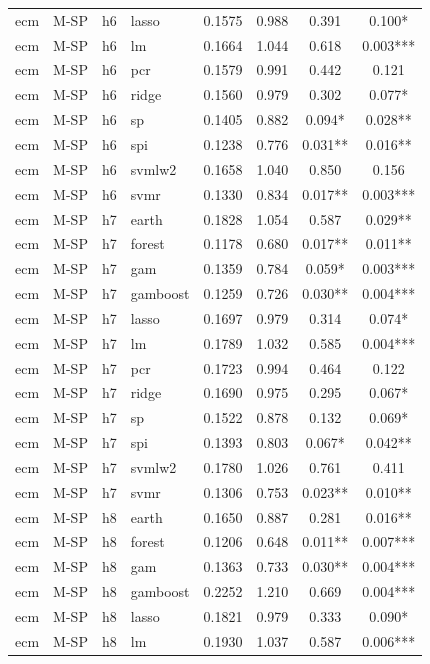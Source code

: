 \begin{ThreePartTable}
\begin{longtable}[t]{llclcccc}
ecm & M-SP & h6 & lasso & 0.1575 & 0.988 & 0.391 & 0.100*\\
ecm & M-SP & h6 & lm & 0.1664 & 1.044 & 0.618 & 0.003***\\
ecm & M-SP & h6 & pcr & 0.1579 & 0.991 & 0.442 & 0.121\\
ecm & M-SP & h6 & ridge & 0.1560 & 0.979 & 0.302 & 0.077*\\
ecm & M-SP & h6 & sp & 0.1405 & 0.882 & 0.094* & 0.028**\\
ecm & M-SP & h6 & spi & 0.1238 & 0.776 & 0.031** & 0.016**\\
ecm & M-SP & h6 & svmlw2 & 0.1658 & 1.040 & 0.850 & 0.156\\
ecm & M-SP & h6 & svmr & 0.1330 & 0.834 & 0.017** & 0.003***\\
\addlinespace
ecm & M-SP & h7 & earth & 0.1828 & 1.054 & 0.587 & 0.029**\\
ecm & M-SP & h7 & forest & 0.1178 & 0.680 & 0.017** & 0.011**\\
ecm & M-SP & h7 & gam & 0.1359 & 0.784 & 0.059* & 0.003***\\
ecm & M-SP & h7 & gamboost & 0.1259 & 0.726 & 0.030** & 0.004***\\
ecm & M-SP & h7 & lasso & 0.1697 & 0.979 & 0.314 & 0.074*\\
ecm & M-SP & h7 & lm & 0.1789 & 1.032 & 0.585 & 0.004***\\
ecm & M-SP & h7 & pcr & 0.1723 & 0.994 & 0.464 & 0.122\\
ecm & M-SP & h7 & ridge & 0.1690 & 0.975 & 0.295 & 0.067*\\
ecm & M-SP & h7 & sp & 0.1522 & 0.878 & 0.132 & 0.069*\\
ecm & M-SP & h7 & spi & 0.1393 & 0.803 & 0.067* & 0.042**\\
ecm & M-SP & h7 & svmlw2 & 0.1780 & 1.026 & 0.761 & 0.411\\
ecm & M-SP & h7 & svmr & 0.1306 & 0.753 & 0.023** & 0.010**\\
\addlinespace
ecm & M-SP & h8 & earth & 0.1650 & 0.887 & 0.281 & 0.016**\\
ecm & M-SP & h8 & forest & 0.1206 & 0.648 & 0.011** & 0.007***\\
ecm & M-SP & h8 & gam & 0.1363 & 0.733 & 0.030** & 0.004***\\
ecm & M-SP & h8 & gamboost & 0.2252 & 1.210 & 0.669 & 0.004***\\
ecm & M-SP & h8 & lasso & 0.1821 & 0.979 & 0.333 & 0.090*\\
ecm & M-SP & h8 & lm & 0.1930 & 1.037 & 0.587 & 0.006***\\

\end{longtable}
\end{ThreePartTable}

